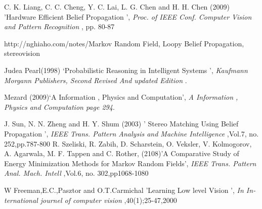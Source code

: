 \documentclass{singlecol-new}
\theoremstyle{TH}{
\newtheorem{lemma}{Lemma}
\newtheorem{theorem}[lemma]{Theorem}
\newtheorem{corrolary}[lemma]{Corrolary}
\newtheorem{conjecture}[lemma]{Conjecture}
\newtheorem{proposition}[lemma]{Proposition}
\newtheorem{claim}[lemma]{Claim}
\newtheorem{stheorem}[lemma]{Wrong Theorem}
\newtheorem{algorithm}{Algorithm}
}
\theoremstyle{THrm}{
\newtheorem{definition}{Definition}[section]
\newtheorem{question}{Question}[section]
\newtheorem{remark}{Remark}
\newtheorem{scheme}{Scheme}
}
\theoremstyle{THhit}{
\newtheorem{case}{Case}[section]
}
\begin{document}
\begin{thebibliography}{10}
	C. K. Liang, C. C. Cheng, Y. C. Lai, L. G. Chen and H. H. Chen                                                                                                                 (2009) 'Hardware Efficient Belief Propagation                                                                                                           ', {\it  Proc. of IEEE Conf. Computer Vision and Pattern Recognition                                                   },  pp. 80-87


http://nghiaho.com/notes/Markov Random Field, Loopy Belief Propagation, stereovision


Judea Pearl(1998) `Probabilistic Reasoning in Intelligent Systems
', {\it Kaufmann Morgann Publishers, Second Revised And updated Edition      }.

 Mezard (2009)`A Information , Physics and Computation', {\it A Information , Physics and Computation page 294}.


	J.  Sun,  N.  N.  Zheng  and  H.  Y.  Shum                                                                                                                 (2003) ' Stereo  Matching  Using  Belief  Propagation                                                                                                          ', {\it  IEEE  Trans.  Pattern  Analysis  and  Machine  Intelligence                                                   },Vol.7,  no.  252,pp.787-800
	R. Szeliski, R. Zabih, D. Scharstein, O. Veksler, V. Kolmogorov, A. Agarwala, M. F. Tappen and C. Rother,                                                                              (2108)'A Comparative Study of Energy Minimization Methods for Markov Random Fields', {\it   IEEE Trans. Pattern Anal. Mach. Intell },Vol.6, no. 302,pp1068-1080

	W Freeman,E.C.,Pasztor and O.T.Carmichal                                                                                                                  'Learning Low level Vision                                                                                                            ', {\it In In- ternational journel of computer vision                                                    },40(1);25-47,2000


\end{thebibliography}
\end{document}
